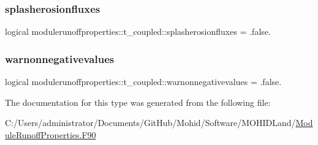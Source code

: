 \subsubsection{\texorpdfstring{splasherosionfluxes}{splasherosionfluxes}}
{\footnotesize\ttfamily logical modulerunoffproperties\+::t\+\_\+coupled\+::splasherosionfluxes = .false.\hspace{0.3cm}{\ttfamily [private]}}

\mbox{\label{structmodulerunoffproperties_1_1t__coupled_a2749ce15c9e48ba97ed463e356c63b75}} 
\subsubsection{\texorpdfstring{warnonnegativevalues}{warnonnegativevalues}}
{\footnotesize\ttfamily logical modulerunoffproperties\+::t\+\_\+coupled\+::warnonnegativevalues = .false.\hspace{0.3cm}{\ttfamily [private]}}



The documentation for this type was generated from the following file\+:\begin{DoxyCompactItemize}
\item 
C\+:/\+Users/administrator/\+Documents/\+Git\+Hub/\+Mohid/\+Software/\+M\+O\+H\+I\+D\+Land/\mbox{\hyperlink{_module_runoff_properties_8_f90}{Module\+Runoff\+Properties.\+F90}}\end{DoxyCompactItemize}
